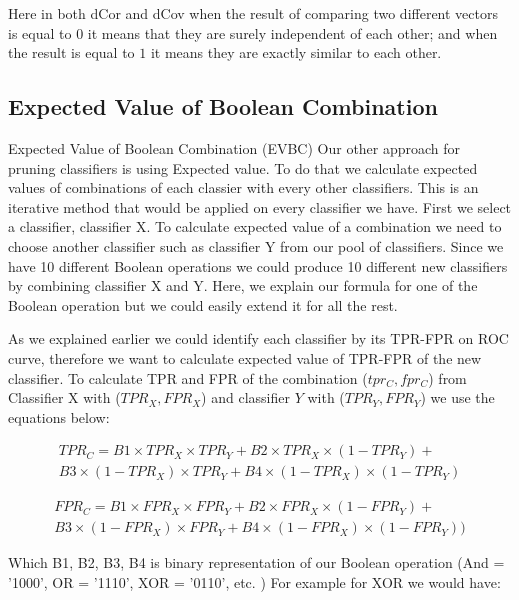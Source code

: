 Here in both dCor and dCov when the result of comparing two different vectors is equal to $0$ it means that they are surely independent of each other; and when the result is equal to $1$ it means they are exactly similar to each other.

\subsection{Expected Value of Boolean Combination}
\label{sub:expected-value}

Expected Value of Boolean Combination (EVBC)
Our other approach for pruning classifiers is using Expected value. To do that we calculate expected values of combinations of each classier with every other classifiers. This is an iterative method that would be applied on every classifier we have. First we select a classifier, classifier X. To calculate expected value of a combination we need to choose another classifier such as classifier Y from our pool of classifiers. Since we have 10 different Boolean operations we could produce 10 different new classifiers by combining classifier X and Y. Here, we explain our formula for one of the Boolean operation but we could easily extend it for all the rest.

As we explained earlier we could identify each classifier by its TPR-FPR on ROC curve, therefore we want to calculate expected value of TPR-FPR of the new classifier. To calculate TPR and FPR of the combination ($tpr_C, fpr_C$) from Classifier X with ($TPR_X, FPR_X$) and classifier $Y$ with ($TPR_Y, FPR_Y$) we use the equations below:

\begin{multline}
TPR_C = B1 \times TPR_X \times TPR_Y+B2\times TPR_X \times(1- TPR_Y)+\\B3\times(1- TPR_X)\times TPR_Y+B4\times(1- TPR_X)\times(1- TPR_Y)
\end{multline}

\begin{multline}
FPR_C = B1 \times FPR_X \times FPR_Y+B2\times FPR_X \times(1- FPR_Y)+\\B3\times(1-FPR_X)\times FPR_Y+B4\times(1- FPR_X)\times(1-FPR_Y))
\end{multline}


Which B1, B2, B3, B4 is binary representation of our Boolean operation (And = '1000', OR = '1110', XOR = '0110', etc. )
For example for XOR we would have:

